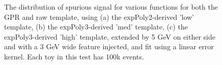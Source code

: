 \begin{figure} 
\begin{center}

\caption{The distribution of spurious signal for various functions for both the GPR and raw template, using (a) the expPoly2-derived 'low' template, (b) the expPoly3-derived 'med' template, (c) the expPoly3-derived 'high' template, extended by 5 GeV on either side and with a 3 GeV wide feature injected, and fit using a linear error kernel. Each toy in this test has 100k events.}
\label{fig:linearkernel_lowpt_100k_Sig_1s}
\end{center}
\end{figure}


